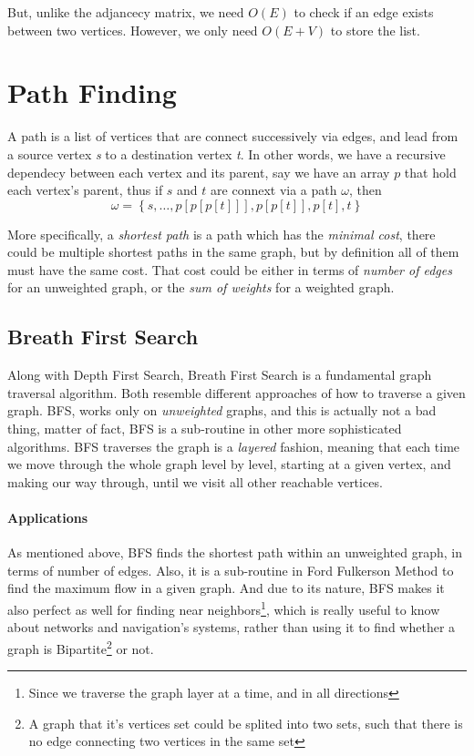 \documentclass[12pt]{article}
\begin{document}
But, unlike the adjancecy matrix, we need $O(E)$ to check if an edge exists between two vertices. However, we only need $O(E+V)$ to store the list.

\section{Path Finding}

A path is a list of vertices that are connect successively via edges, and lead from a source vertex \textit{s} to a destination vertex \textit{t}. In other words, we have a recursive dependecy between each vertex and its parent, say we have an array $p$ that hold each vertex's parent, thus if $s$ and $t$ are connext via a path $\omega$, then \[
  \omega = \left\{s, \ldots, p[p[p[t]]] ,p[p[t]],p[t], t\right\}
\]



More specifically, a \textit{shortest path} is a path which has the \textit{minimal cost}, there could be multiple shortest paths in the same graph, but by definition all of them must have the same cost. That cost could be either in terms of \textit{number of edges} for an unweighted graph, or the \textit{sum of weights} for a weighted graph.


\subsection{Breath First Search}

Along with Depth First Search, Breath First Search is a fundamental graph traversal algorithm. Both resemble different approaches of how to traverse a given graph. BFS, works only on \textit{unweighted} graphs, and this is actually not a bad thing, matter of fact, BFS is a sub-routine in other more sophisticated algorithms. BFS traverses the graph is a \textit{layered} fashion, meaning that each time we move through the whole graph level by level, starting at a given vertex, and making our way through, until we visit all other reachable vertices.

\paragraph{Applications} As mentioned above, BFS finds the shortest path within  an unweighted graph, in terms of number of edges. Also, it is a sub-routine in Ford Fulkerson Method to find the maximum flow in a given graph. And due to its nature, BFS makes it also perfect as well for finding near neighbors\footnote{Since we traverse the graph layer at a time, and in all directions}, which is really useful to know about networks and navigation's systems, rather than using it to find whether a graph is Bipartite\footnote{A graph that it's vertices set could be splited into two sets, such that there is no edge connecting two vertices in the same set} or not.
\end{document}
